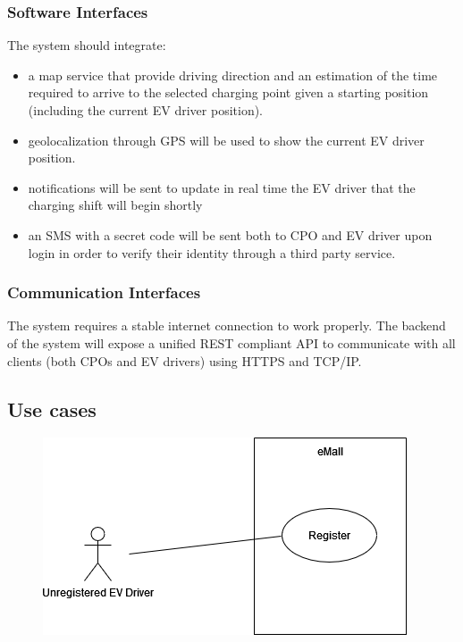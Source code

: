 \subsubsection{Software Interfaces}
The system should integrate:
\begin{itemize}
    \item a map service that provide driving direction
          and an estimation of the time required to arrive to the selected charging point
          given a starting position (including the current EV driver position).
    \item geolocalization through GPS will be used to show the current EV driver
          position.
    \item notifications will be sent to update in real time the EV driver
          that the charging shift will begin shortly
    \item an SMS with a secret code will be sent both to CPO and EV driver
          upon login in order to verify their identity through a third party service.
\end{itemize}

\subsubsection{Communication Interfaces}
The system requires a stable internet connection to work properly.
The backend of the system will expose a unified REST compliant API to communicate
with all clients (both CPOs and EV drivers) using HTTPS and TCP/IP.


\subsection{Use cases}

\begin{figure}[H]
    \centering
    \includegraphics[scale=0.6]{src/use_case_diagram/driver_registration.png}
\end{figure}

